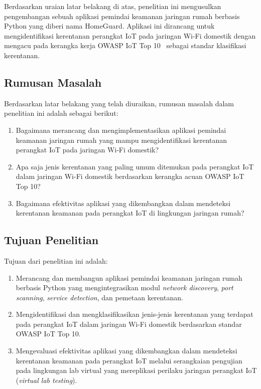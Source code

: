 \documentclass[conference]{IEEEtran}
\begin{document}
Berdasarkan uraian latar belakang di atas, penelitian ini mengusulkan pengembangan sebuah aplikasi pemindai keamanan jaringan rumah berbasis Python yang diberi nama HomeGuard. Aplikasi ini dirancang untuk mengidentifikasi kerentanan perangkat IoT pada jaringan Wi-Fi domestik dengan mengacu pada kerangka kerja OWASP IoT Top 10\ \cite{owasp2018} sebagai standar klasifikasi kerentanan.

\subsection{Rumusan Masalah}

Berdasarkan latar belakang yang telah diuraikan, rumusan masalah dalam penelitian ini adalah sebagai berikut:
\begin{enumerate}
    \item Bagaimana merancang dan mengimplementasikan aplikasi pemindai keamanan jaringan rumah yang mampu mengidentifikasi kerentanan perangkat IoT pada jaringan Wi-Fi domestik?
    \item Apa saja jenis kerentanan yang paling umum ditemukan pada perangkat IoT dalam jaringan Wi-Fi domestik berdasarkan kerangka acuan OWASP IoT Top 10?
    \item Bagaimana efektivitas aplikasi yang dikembangkan dalam mendeteksi kerentanan keamanan pada perangkat IoT di lingkungan jaringan rumah?
\end{enumerate}

\subsection{Tujuan Penelitian}

Tujuan dari penelitian ini adalah:
\begin{enumerate}
    \item Merancang dan membangun aplikasi pemindai keamanan jaringan rumah berbasis Python yang mengintegrasikan modul \textit{network discovery}, \textit{port scanning}, \textit{service detection}, dan pemetaan kerentanan.
    \item Mengidentifikasi dan mengklasifikasikan jenis-jenis kerentanan yang terdapat pada perangkat IoT dalam jaringan Wi-Fi domestik berdasarkan standar OWASP IoT Top 10.
    \item Mengevaluasi efektivitas aplikasi yang dikembangkan dalam mendeteksi kerentanan keamanan pada perangkat IoT melalui serangkaian pengujian pada lingkungan lab virtual yang mereplikasi perilaku jaringan perangkat IoT (\textit{virtual lab testing}).
\end{enumerate}
\end{document}
